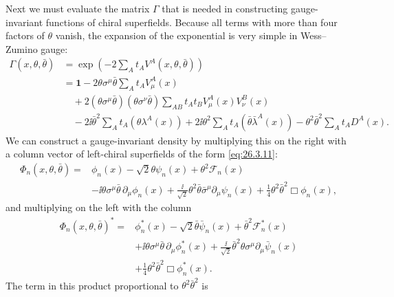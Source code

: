 Next we must evaluate the matrix \(\Gamma\) that is needed in constructing
gauge-invariant functions of chiral superfields. Because all terms with more
than four factors of \(\theta\) vanish, the expansion of the exponential is
very simple in Wess--Zumino gauge:
\[
  \begin{aligned}
  \Gamma(x,\theta,\bar\theta)
  &=\exp\left(-2\sum_A t_AV^A(x,\theta,\bar\theta)\right)
  \\
  &=\mathbf{1}
  -2\theta\sigma^\mu\bar\theta
    \sum_A t_AV^A_\mu(x)
  \\
  &\quad+2(\theta\sigma^\mu\bar\theta)
    (\theta\sigma^\nu\bar\theta)
    \sum_{AB}t_At_BV^A_\mu(x)V^B_\nu(x)
  \\
  &\quad-2\ii\bar\theta^2\sum_A t_A(\theta\lambda^A(x))
    +2\ii\theta^2\sum_A t_A(\bar\theta\bar\lambda^A(x))
  -\theta^2\bar\theta^2\sum_A t_AD^A(x).
  \end{aligned}
\]
We can construct a gauge-invariant density by multiplying this on the right
with a column vector of left-chiral superfields of the form
\eqref{eq:26.3.11}:
\[
  \begin{aligned}
  \Phi_n(x,\theta,\bar\theta)={}&
  \phi_n(x)-\sqrt{2}\theta\psi_n(x)
  +\theta^2\mathcal{F}_n(x)
  \\
  &-\ii\theta\sigma^\mu\bar\theta\,\partial_\mu\phi_n(x)
  +\frac{\ii}{\sqrt{2}}\theta^2\bar\theta\bar\sigma^\mu
    \partial_\mu\psi_n(x)
  +\frac14\theta^2\bar\theta^2\Box\phi_n(x),
  \end{aligned}
\]
and multiplying on the left with the column
\[
  \begin{aligned}
  \Phi_n(x,\theta,\bar\theta)^*={}&
  \phi_n^*(x)-\sqrt{2}\bar\theta\bar\psi_n(x)
  +\bar\theta^2\mathcal{F}_n^*(x)
  \\
  &+\ii\theta\sigma^\mu\bar\theta\,\partial_\mu\phi_n^*(x)
  +\frac{\ii}{\sqrt{2}}\bar\theta^2\theta\sigma^\mu
    \partial_\mu\bar\psi_n(x)
  \\
  &+\frac14\theta^2\bar\theta^2\Box\phi_n^*(x).
  \end{aligned}
\]
The term in this product proportional to \(\theta^2\bar\theta^2\) is
